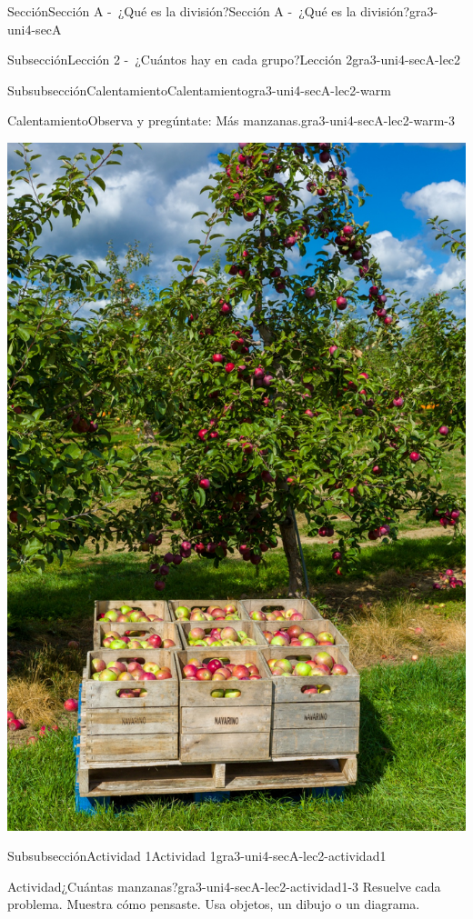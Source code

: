 \documentclass[twoside,10pt,]{article}
\begin{document}
\begin{sectionptx}{Sección}{Sección A -~¿Qué es la división?}{}{Sección A -~¿Qué es la división?}{}{}{gra3-uni4-secA}
\begin{subsectionptx}{Subsección}{Lección 2 -~¿Cuántos hay en cada grupo?}{}{Lección 2}{}{}{gra3-uni4-secA-lec2}
\begin{subsubsectionptx}{Subsubsección}{Calentamiento}{}{Calentamiento}{}{}{gra3-uni4-secA-lec2-warm}
\begin{exploration}{Calentamiento}{Observa y pregúntate: Más manzanas.}{gra3-uni4-secA-lec2-warm-3}
\begin{image}{0}{1}{0}{}
\includegraphics[width=\linewidth]{external/jpg-source/3.4.A2 Warrm-up.jpg}
\end{image}%
\end{exploration}%
\end{subsubsectionptx}
%
%
\typeout{************************************************}
\typeout{************************************************}
%
\begin{subsubsectionptx}{Subsubsección}{Actividad 1}{}{Actividad 1}{}{}{gra3-uni4-secA-lec2-actividad1}
\begin{activity}{Actividad}{¿Cuántas manzanas?}{gra3-uni4-secA-lec2-actividad1-3}%
Resuelve cada problema. Muestra cómo pensaste. Usa objetos, un dibujo o un diagrama.%
\par
%
\begin{enumerate}

\end{enumerate}
\end{activity}
\end{subsubsectionptx}
\end{subsectionptx}
\end{sectionptx}
\end{document}
